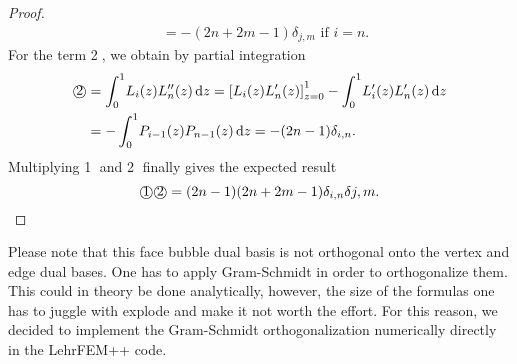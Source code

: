 \documentclass[10pt,a4paper]{article}
\begin{document}
\begin{proof}
\begin{align*}
            &= -(2n+2m-1)\delta_{j,m} \mbox{ if } i = n.
        \end{align*}
        For the term \textcircled{2}, we obtain by partial integration
        \begin{align*}
            \text{\textcircled{2}} &= \int_0^1\! L_i(z)L_n''(z) \,\mathrm{d}z = \left[ L_i(z)L_n'(z) \right]_{z=0}^1 - \int_0^1\! L_i'(z)L_n'(z) \,\mathrm{d}z \\
            &= -\int_0^1\! P_{i-1}(z)P_{n-1}(z) \,\mathrm{d}z = -(2n-1)\delta_{i,n}.
        \end{align*}
        Multiplying \textcircled{1} and \textcircled{2} finally gives the expected result
        \begin{equation*}
            \text{\textcircled{1}}\text{\textcircled{2}} = (2n-1)(2n+2m-1)\delta_{i,n}\delta{j,m}.
        \end{equation*}
    \end{proof}
    
    Please note that this face bubble dual basis is not orthogonal onto the vertex and edge dual bases. One has to apply Gram-Schmidt in order to orthogonalize them. This could in theory be done analytically, however, the size of the formulas one has to juggle with explode and make it not worth the effort. For this reason, we decided to implement the Gram-Schmidt orthogonalization numerically directly in the LehrFEM++ code.

    
\end{document}

